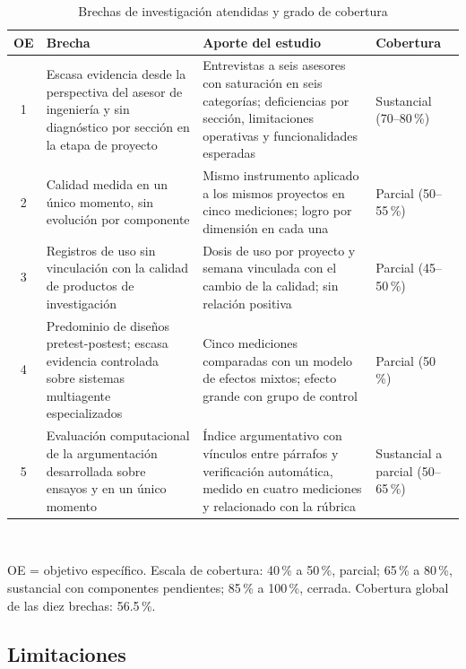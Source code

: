 \documentclass[journal]{IEEEtran}
\begin{document}
\begin{table}[!t]
\caption{Brechas de investigación atendidas y grado de cobertura}
\label{tab:gaps}
\centering
\footnotesize
\begin{tabular}{cL{2.7cm}L{2.9cm}L{1.25cm}}
\toprule
OE & Brecha & Aporte del estudio & Cobertura \\
 & Escasa evidencia desde la perspectiva del asesor de ingeniería y sin diagnóstico por sección en la etapa de proyecto & Entrevistas a seis asesores con saturación en seis categorías; deficiencias por sección, limitaciones operativas y funcionalidades esperadas & Sustancial (70--80\,\%) \\
2 & Calidad medida en un único momento, sin evolución por componente & Mismo instrumento aplicado a los mismos proyectos en cinco mediciones; logro por dimensión en cada una & Parcial (50--55\,\%) \\
3 & Registros de uso sin vinculación con la calidad de productos de investigación & Dosis de uso por proyecto y semana vinculada con el cambio de la calidad; sin relación positiva & Parcial (45--50\,\%) \\
4 & Predominio de diseños pretest-postest; escasa evidencia controlada sobre sistemas multiagente especializados & Cinco mediciones comparadas con un modelo de efectos mixtos; efecto grande con grupo de control & Parcial (50\,\%) \\
5 & Evaluación computacional de la argumentación desarrollada sobre ensayos y en un único momento & Índice argumentativo con vínculos entre párrafos y verificación automática, medido en cuatro mediciones y relacionado con la rúbrica & Sustancial a parcial (50--65\,\%) \\
\bottomrule
\end{tabular}
\\[2pt]
\raggedright\scriptsize OE = objetivo específico. Escala de cobertura: 40\,\% a 50\,\%, parcial; 65\,\% a 80\,\%, sustancial con componentes pendientes; 85\,\% a 100\,\%, cerrada. Cobertura global de las diez brechas: 56.5\,\%.
\end{table}

\subsection{Limitaciones}
\end{document}
